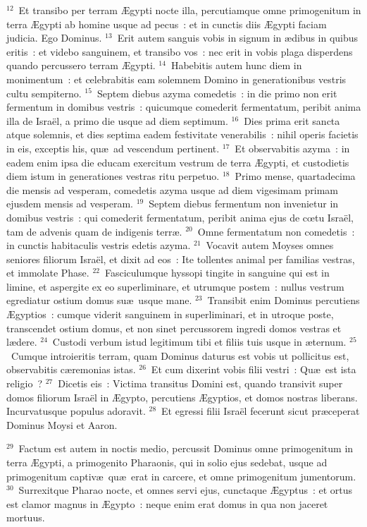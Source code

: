 ${}^{12}$~Et transibo per terram \AE gypti nocte illa, percutiamque omne primogenitum in terra \AE gypti ab homine usque ad pecus~: et in cunctis diis \AE gypti faciam judicia. Ego Dominus.
${}^{13}$~Erit autem sanguis vobis in signum in \ae dibus in quibus eritis~: et videbo sanguinem, et transibo vos~: nec erit in vobis plaga disperdens quando percussero terram \AE gypti.
${}^{14}$~Habebitis autem hunc diem in monimentum~: et celebrabitis eam solemnem Domino in generationibus vestris cultu sempiterno.
${}^{15}$~Septem diebus azyma comedetis~: in die primo non erit fermentum in domibus vestris~: quicumque comederit fermentatum, peribit anima illa de Isra\"el, a primo die usque ad diem septimum.
${}^{16}$~Dies prima erit sancta atque solemnis, et dies septima eadem festivitate venerabilis~: nihil operis facietis in eis, exceptis his, qu\ae\ ad vescendum pertinent.
${}^{17}$~Et observabitis azyma~: in eadem enim ipsa die educam exercitum vestrum de terra \AE gypti, et custodietis diem istum in generationes vestras ritu perpetuo.
${}^{18}$~Primo mense, quartadecima die mensis ad vesperam, comedetis azyma usque ad diem vigesimam primam ejusdem mensis ad vesperam.
${}^{19}$~Septem diebus fermentum non invenietur in domibus vestris~: qui comederit fermentatum, peribit anima ejus de cœtu Isra\"el, tam de advenis quam de indigenis terr\ae .
${}^{20}$~Omne fermentatum non comedetis~: in cunctis habitaculis vestris edetis azyma.
${}^{21}$~Vocavit autem Moyses omnes seniores filiorum Isra\"el, et dixit ad eos~: Ite tollentes animal per familias vestras, et immolate Phase.
${}^{22}$~Fasciculumque hyssopi tingite in sanguine qui est in limine, et aspergite ex eo superliminare, et utrumque postem~: nullus vestrum egrediatur ostium domus su\ae\ usque mane.
${}^{23}$~Transibit enim Dominus percutiens \AE gyptios~: cumque viderit sanguinem in superliminari, et in utroque poste, transcendet ostium domus, et non sinet percussorem ingredi domos vestras et l\ae dere.
${}^{24}$~Custodi verbum istud legitimum tibi et filiis tuis usque in \ae ternum.
${}^{25}$~Cumque introieritis terram, quam Dominus daturus est vobis ut pollicitus est, observabitis c\ae remonias istas.
${}^{26}$~Et cum dixerint vobis filii vestri~: Qu\ae\ est ista religio~?
${}^{27}$~Dicetis eis~: Victima transitus Domini est, quando transivit super domos filiorum Isra\"el in \AE gypto, percutiens \AE gyptios, et domos nostras liberans. Incurvatusque populus adoravit.
${}^{28}$~Et egressi filii Isra\"el fecerunt sicut pr\ae ceperat Dominus Moysi et Aaron.


${}^{29}$~Factum est autem in noctis medio, percussit Dominus omne primogenitum in terra \AE gypti, a primogenito Pharaonis, qui in solio ejus sedebat, usque ad primogenitum captiv\ae\ qu\ae\ erat in carcere, et omne primogenitum jumentorum.
${}^{30}$~Surrexitque Pharao nocte, et omnes servi ejus, cunctaque \AE gyptus~: et ortus est clamor magnus in \AE gypto~: neque enim erat domus in qua non jaceret mortuus.


